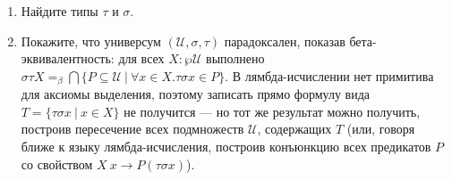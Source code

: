 \documentclass[10pt,a4paper,oneside]{article}
\begin{document}
\begin{enumerate}
\begin{enumerate}
\item Найдите типы $\tau$ и $\sigma$.
\item Покажите, что универсум $(\mathcal{U},\sigma,\tau)$ парадоксален, показав бета-эквивалентность:
для всех $X: \wp \mathcal{U}$ выполнено $\sigma\tau X =_\beta \bigcap \{ P \subseteq \mathcal{U}\ |\ \forall x \in X.\tau\sigma x \in P \}$.
В лямбда-исчислении нет примитива для аксиомы выделения, поэтому записать прямо формулу вида
$T = \{ \tau\sigma x\ |\ x \in X\}$ не получится --- но тот же результат можно получить, построив пересечение всех подмножеств $\mathcal{U}$, содержащих $T$
(или, говоря ближе к языку лямбда-исчисления, построив конъюнкцию всех предикатов $P$ со свойством $X\ x\rightarrow P(\tau\sigma x)$).
\end{enumerate}
\end{enumerate}
\end{document}
